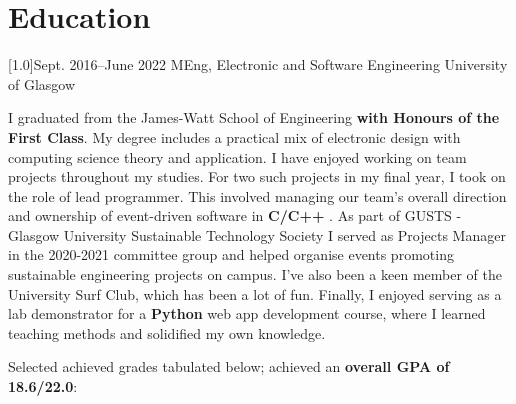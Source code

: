 \documentclass[a4paper]{cv-style}     %
\begin{document}
\hspace*{-5.5cm}\begin{minipage}[b]{1.4\textwidth}
\vspace{-0.0cm}
\section{Education}
  \vspace{0.2cm}
\begin{entrylist}
\entry
{\scalebox{.8}[1.0]{Sept. 2016--June 2022}}
{MEng, Electronic and Software Engineering}
{University of Glasgow}
{
I graduated from the James-Watt School of Engineering \textbf{with Honours of the First Class}. My degree includes a practical mix of electronic design with computing science theory and application.
I have enjoyed working on team projects throughout my studies. For two such projects in my final year, I took on the role of lead programmer. This involved managing our team's overall direction and ownership of event-driven software in \textbf{C/C++} . As part of GUSTS - Glasgow University Sustainable Technology Society I served as Projects Manager in the 2020-2021 committee group and helped organise events promoting sustainable engineering projects on campus. I've also been a keen member of the University Surf Club, which has been a lot of fun. Finally, I enjoyed serving as a lab demonstrator for a \textbf{Python} web app development course, where I learned teaching methods and solidified my own knowledge.
\vspace{0.1cm}



Selected achieved grades tabulated below; achieved an \textbf{overall GPA of 18.6/22.0}:

\vspace{0.2cm}

}
\end{entrylist}
\end{minipage}
\end{document}
